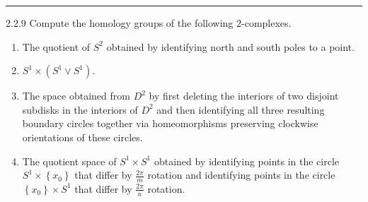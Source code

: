 \documentclass[a4paper, 12pt]{article}
\begin{document}
\noindent\rule{7in}{2.8pt}
\begin{problem}{2.2.9}
Compute the homology groups of the following \(2\)-complexes.
\begin{enumerate}
\item The quotient of \(S^2\) obtained by identifying north and south poles to a point.
\item \(S^1\times (S^1\vee S^1)\).
\item The space obtained from \(D^2\) by first deleting the interiors of two disjoint subdisks in the interiors of \(D^2\) and then identifying all three resulting boundary circles together 
      via homeomorphisms preserving clockwise orientations of these circles.
\item The quotient space of \(S^1\times S^1\) obtained by identifying points in the circle \(S^1\times \left\{ x_0 \right\}\) that differ by \(\frac{2\pi}{m}\) rotation and identifying points in the circle \(\left\{ x_0 \right\}\times S^1\) that 
    differ by \(\frac{2\pi}{n}\) rotation. 
\end{enumerate}
\end{problem}
\end{document}
